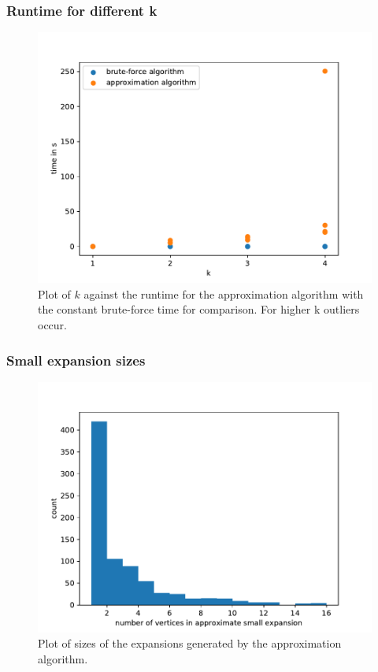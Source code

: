\documentclass{beamer}
\begin{document}
\begin{frame}
\frametitle{Runtime for different k}
	\begin{figure}
		\centering
		\includegraphics[scale=0.5]{figures/k_all_logs.pdf}
		\caption[Plot k against time]{Plot of $k$ against the runtime for the approximation algorithm with the constant brute-force time for comparison. For higher k outliers occur.\label{fig:k_time}}
	\end{figure}
\end{frame}

\begin{frame}
\frametitle{Small expansion sizes}
\begin{figure}
	\centering
	\includegraphics[scale=0.5]{figures/quality_evaluation_log_small_expansion_sizes.pdf}
	\caption[Plot sizes small expansions]{Plot of sizes of the expansions generated by the approximation algorithm.\label{fig:sizes_small_expansions}}
\end{figure}
\end{frame}
\end{document}

